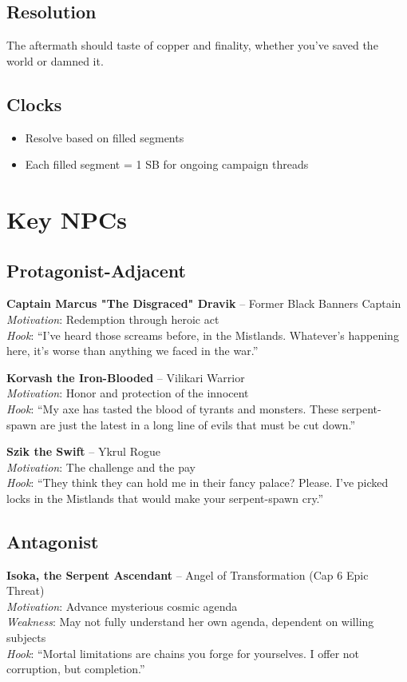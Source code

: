 \documentclass[11pt]{article}
\begin{document}
\subsection*{Resolution}
The aftermath should taste of copper and finality, whether you've saved the world or damned it.

\subsection*{Clocks}
\begin{itemize}
    \item Resolve based on filled segments
    \item Each filled segment = 1 SB for ongoing campaign threads
\end{itemize}

\section*{Key NPCs}

\subsection*{Protagonist-Adjacent}
\textbf{Captain Marcus "The Disgraced" Dravik} – Former Black Banners Captain\\
\textit{Motivation}: Redemption through heroic act\\
\textit{Hook}: “I've heard those screams before, in the Mistlands. Whatever's happening here, it's worse than anything we faced in the war.”

\textbf{Korvash the Iron-Blooded} – Vilikari Warrior\\
\textit{Motivation}: Honor and protection of the innocent\\
\textit{Hook}: “My axe has tasted the blood of tyrants and monsters. These serpent-spawn are just the latest in a long line of evils that must be cut down.”

\textbf{Szik the Swift} – Ykrul Rogue\\
\textit{Motivation}: The challenge and the pay\\
\textit{Hook}: “They think they can hold me in their fancy palace? Please. I've picked locks in the Mistlands that would make your serpent-spawn cry.”

\subsection*{Antagonist}
\textbf{Isoka, the Serpent Ascendant} – Angel of Transformation (Cap 6 Epic Threat)\\
\textit{Motivation}: Advance mysterious cosmic agenda\\
\textit{Weakness}: May not fully understand her own agenda, dependent on willing subjects\\
\textit{Hook}: “Mortal limitations are chains you forge for yourselves. I offer not corruption, but completion.”
\end{document}
